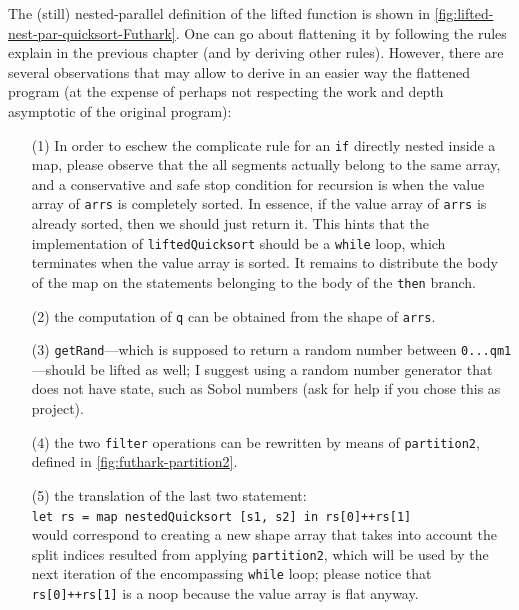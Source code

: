 \documentclass[acmsmall,review]{acmart}\settopmatter{printfolios=true,printccs=false,printacmref=false}
\begin{document}
The (still) nested-parallel definition of the lifted function is 
shown in \cref{fig:lifted-nest-par-quicksort-Futhark}. One can go
about flattening it by following the rules explain in the previous
chapter (and by deriving other rules). However, there are several
observations that may allow to derive in an easier way the flattened
program (at the expense of perhaps not respecting the work and
depth asymptotic of the original program):
\begin{itemize}
    \item[(1)] In order to eschew the complicate rule for an \lstinline{if}
        directly nested inside a map, please observe that the all segments
        actually belong to the same array, and a conservative and safe  
        stop condition for recursion is when the value array of {\tt arrs}
        is completely sorted. In essence, if the value array of {\tt arrs}
        is already sorted, then we should just return it. This hints that
        the implementation of {\tt liftedQuicksort} should be a \lstinline{while}
        loop, which terminates when the value array is sorted.
        It remains to distribute the body of the map on the statements
        belonging to the body of the \lstinline{then} branch.
    \item[(2)] the computation of {\tt q} can be obtained from the
        shape of {\tt arrs}.
    \item[(3)] {\tt getRand}---which is supposed to return a random
            number between {\tt 0...qm1}---should be lifted as well;
            I suggest using a random number generator that does not
            have state, such as Sobol numbers (ask for help if you
            chose this as project).
    \item[(4)] the two \lstinline{filter} operations can be rewritten
            by means of {\tt partition2}, defined in 
            \cref{fig:futhark-partition2}.
    \item[(5)] the translation of the last two statement:\\
            \lstinline{let rs = map nestedQuicksort [s1, s2] in rs[0]++rs[1]}\\
            would correspond to creating a new shape array that
            takes into account the split indices resulted from applying 
            \lstinline{partition2}, which will be used by the next 
            iteration of the encompassing \lstinline{while} loop;
            please notice that {\tt rs[0]++rs[1]} is a noop because
            the value array is flat anyway.
\end{itemize}
\end{document}
